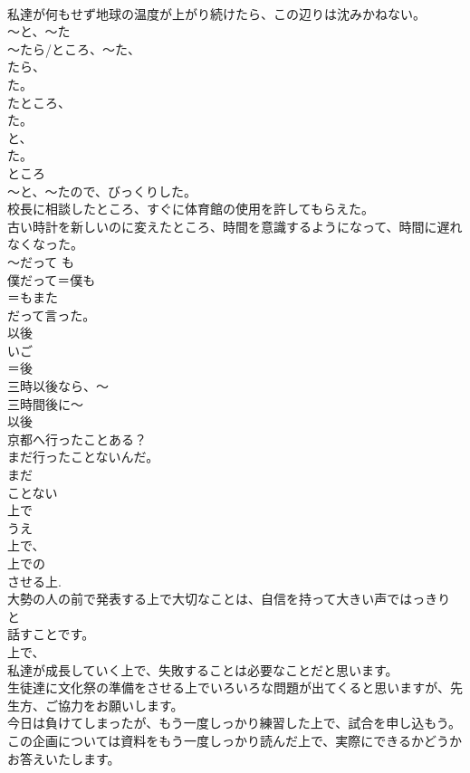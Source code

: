 \documentclass[8pt]{extreport}
\begin{document}
\begin{CJK}{UTF8}{min}
\\	私達が何もせず地球の温度が上がり続けたら、この辺りは沈みかねない。
\\	～と、～た
\\	～たら/ところ、～た、
\\	たら、
\\	た。
\\	たところ、
\\	た。
\\	と、
\\	た。
\\	ところ 
\\	～と、～たので、びっくりした。　
\\	校長に相談したところ、すぐに体育館の使用を許してもらえた。
\\	古い時計を新しいのに変えたところ、時間を意識するようになって、時間に遅れなくなった。
\\	～だって	も
\\	僕だって＝僕も
\\	＝もまた
\\	だって言った。 
\\	以後
\\	いご
\\	＝後
\\	三時以後なら、～
\\	三時間後に～　
\\	以後 
\\	京都へ行ったことある？
\\	まだ行ったことないんだ。
\\	まだ　
\\	ことない 
\\	上で
\\	うえ
\\	上で、
\\	上での
\\	させる上. 
\\	大勢の人の前で発表する上で大切なことは、自信を持って大きい声ではっきり
\\	と
\\	話すことです。
\\	上で、
\\	私達が成長していく上で、失敗することは必要なことだと思います。
\\	生徒達に文化祭の準備をさせる上でいろいろな問題が出てくると思いますが、先生方、ご協力をお願いします。
\\	今日は負けてしまったが、もう一度しっかり練習した上で、試合を申し込もう。
\\	この企画については資料をもう一度しっかり読んだ上で、実際にできるかどうかお答えいたします。

\end{CJK}
\end{document}
